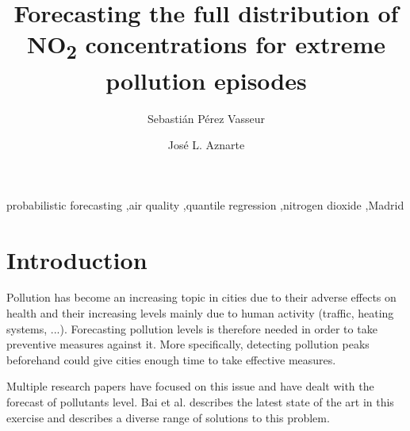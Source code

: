 \documentclass[a4paper,twocolumn,5p]{elsarticle}
\begin{document}
\newcommand{\no}{NO\textsubscript{2}\xspace}

\begin{frontmatter}

  \title{Forecasting the full distribution of \no concentrations for
    extreme pollution episodes}

\author{Sebasti\'an P\'erez Vasseur} 
\address{Artificial Intelligence Department\\Universidad Nacional de
  Educaci\'on a Distancia --- UNED\\c/ Juan del Rosal, 16, Madrid, Spain}

\author{Jos\'e L. Aznarte}
\address{Artificial Intelligence Department\\Universidad Nacional de
  Educaci\'on a Distancia --- UNED\\c/ Juan del Rosal, 16, Madrid, Spain}



\begin{abstract}
\end{abstract}

\begin{keyword}
probabilistic forecasting \sep air quality \sep quantile regression
\sep nitrogen dioxide \sep Madrid
\end{keyword}

\end{frontmatter}


\section{Introduction }
\label{sec:intro}


Pollution has become an increasing topic in cities due to their
adverse effects on health and their increasing levels mainly due to
human activity (traffic, heating systems, ...). Forecasting pollution
levels is therefore needed in order to take preventive measures
against it. More specifically, detecting pollution peaks beforehand
could give cities enough time to take effective measures.

Multiple research papers have focused on this issue and have dealt
with the forecast of pollutants level. Bai et al. \cite{bai_air_2018}
describes the latest state of the art in this exercise and describes 
a diverse range of solutions to this problem.
\end{document}
